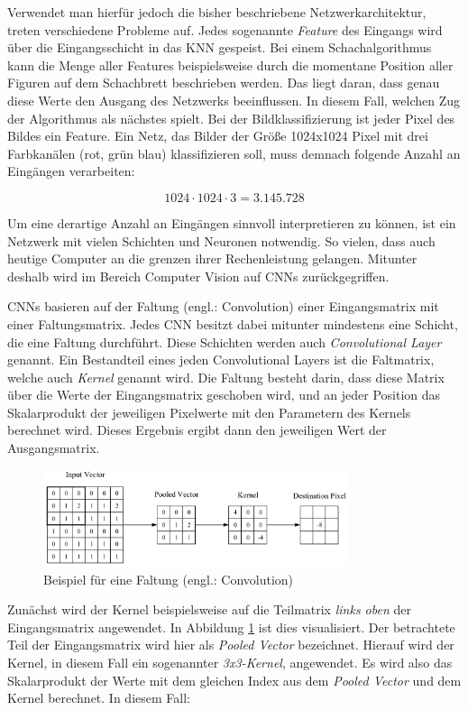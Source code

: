 Verwendet man hierfür jedoch die bisher beschriebene Netzwerkarchitektur, treten verschiedene Probleme auf. Jedes sogenannte \emph{Feature} des Eingangs wird über die Eingangsschicht in das \ac{KNN} gespeist. Bei einem Schachalgorithmus kann die Menge aller Features beispielsweise durch die momentane Position aller Figuren auf dem Schachbrett beschrieben werden. Das liegt daran, dass genau diese Werte den Ausgang des Netzwerks beeinflussen. In diesem Fall, welchen Zug der Algorithmus als nächstes spielt. Bei der Bildklassifizierung ist jeder Pixel des Bildes ein Feature. Ein Netz, das Bilder der Größe 1024x1024 Pixel mit drei Farbkanälen (rot, grün blau) klassifizieren soll, muss demnach folgende Anzahl an Eingängen verarbeiten:

\begin{equation}
   1024 \cdot 1024 \cdot 3 = 3.145.728
\end{equation}

Um eine derartige Anzahl an Eingängen sinnvoll interpretieren zu können, ist ein Netzwerk mit vielen Schichten und Neuronen notwendig. So vielen, dass auch heutige Computer an die grenzen ihrer Rechenleistung gelangen. Mitunter deshalb wird im Bereich Computer Vision auf \acp{CNN} zurückgegriffen. 

\acp{CNN} basieren auf der Faltung (engl.: Convolution) einer Eingangsmatrix mit einer Faltungsmatrix. Jedes \ac{CNN} besitzt dabei mitunter mindestens eine Schicht, die eine Faltung durchführt. Diese Schichten werden auch \emph{Convolutional Layer} genannt. Ein Bestandteil eines jeden Convolutional Layers ist die Faltmatrix, welche auch \emph{Kernel} genannt wird. Die Faltung besteht darin, dass diese Matrix über die Werte der Eingangsmatrix geschoben wird, und an jeder Position das Skalarprodukt der jeweiligen Pixelwerte mit den Parametern des Kernels berechnet wird. Dieses Ergebnis ergibt dann den jeweiligen Wert der Ausgangsmatrix.

\begin{figure}[H]
      \centering
      \includegraphics[width=0.8\textwidth]{images/KNNs/CNN Convolution.png}
      \caption{Beispiel für eine Faltung (engl.: Convolution) \cite{cnnsIntroduction}}
      \label{fig:convolution}
\end{figure}

Zunächst wird der Kernel beispielsweise auf die Teilmatrix \emph{links oben} der Eingangsmatrix angewendet. In Abbildung \ref{fig:convolution} ist dies visualisiert. Der betrachtete Teil der Eingangsmatrix wird hier als \emph{Pooled Vector} bezeichnet. Hierauf wird der Kernel, in diesem Fall ein sogenannter \emph{3x3-Kernel}, angewendet. Es wird also das Skalarprodukt der Werte mit dem gleichen Index aus dem \emph{Pooled Vector} und dem Kernel berechnet. In diesem Fall:
